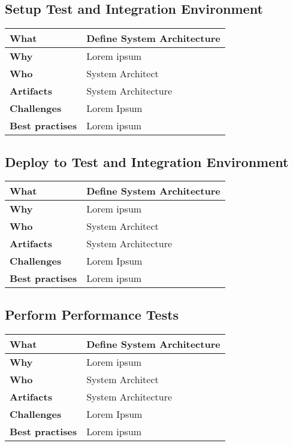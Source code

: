 \subsection{Setup Test and Integration Environment}
 \label{table:ch6_Task_Define_System_Architect}
\begin{tabular}
	{|m{3cm}|m{10cm}|} \hline \bfseries What & Define System Architecture\\
	\hline \bfseries Why & Lorem ipsum\\
	\hline \bfseries Who & System Architect\\
	\hline \bfseries Artifacts & System Architecture\\
	\hline \bfseries Challenges & Lorem Ipsum\\
	\hline \bfseries Best practises & Lorem ipsum\\
	\hline 
\end{tabular}

\subsection{Deploy to Test and Integration Environment}
 \label{table:ch6_Task_Define_System_Architect}
\begin{tabular}
	{|m{3cm}|m{10cm}|} \hline \bfseries What & Define System Architecture\\
	\hline \bfseries Why & Lorem ipsum\\
	\hline \bfseries Who & System Architect\\
	\hline \bfseries Artifacts & System Architecture\\
	\hline \bfseries Challenges & Lorem Ipsum\\
	\hline \bfseries Best practises & Lorem ipsum\\
	\hline 
\end{tabular}

\subsection{Perform Performance Tests}
 \label{table:ch6_Task_Define_System_Architect}
\begin{tabular}
	{|m{3cm}|m{10cm}|} \hline \bfseries What & Define System Architecture\\
	\hline \bfseries Why & Lorem ipsum\\
	\hline \bfseries Who & System Architect\\
	\hline \bfseries Artifacts & System Architecture\\
	\hline \bfseries Challenges & Lorem Ipsum\\
	\hline \bfseries Best practises & Lorem ipsum\\
	\hline 
\end{tabular}

